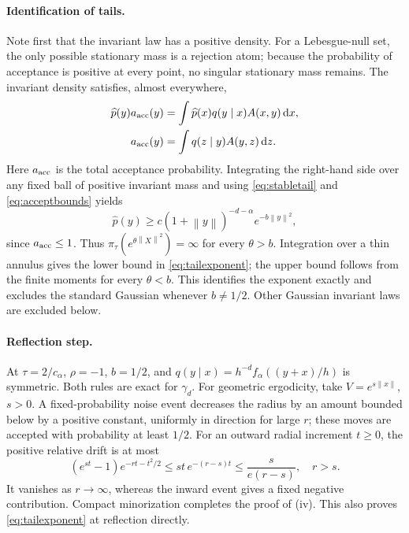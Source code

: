 \documentclass[pdflatex,iicol,sn-mathphys-ay]{sn-jnl}
\theoremstyle{definition}\newtheorem{definition}[theorem]{Definition}
\theoremstyle{remark}\newtheorem{remark}[theorem]{Remark}
\numberwithin{equation}{section}
\newcommand{\norm}[1]{\left\lVert#1\right\rVert}\newcommand{\TV}{\mathrm{TV}}
\newcommand{\dd}{\,\mathrm d}\newcommand{\cA}{c_\alpha}\newcommand{\sg}{\operatorname{sigmoid}}
\newcommand{\1}{\mathbf 1}
\begin{document}
\paragraph{Identification of tails.} Note first that the invariant law has a positive density. For a Lebesgue-null set, the only possible stationary mass is a rejection atom; because the probability of acceptance is positive at every point, no singular stationary mass remains. The invariant density satisfies, almost everywhere,
\begin{equation}
\begin{aligned}
\widehat p(y)a_{\rm acc}(y)&=\int\widehat p(x)q(y\mid x)A(x,y)\dd x,\\
a_{\rm acc}(y)&=\int q(z\mid y)A(y,z)\dd z.
\end{aligned}\label{eq:stationaryflux}
\end{equation}
Here $a_{\rm acc}$ is the total acceptance probability. Integrating the right-hand side over any fixed ball of positive invariant mass and using \eqref{eq:stabletail} and \eqref{eq:acceptbounds} yields
\begin{equation}
\widehat p(y)\ge c(1+\norm y)^{-d-\alpha}e^{-b\norm y^2},\label{eq:densitylower}
\end{equation}
since $a_{\rm acc}\le1$. Thus $\widehat\pi_\tau(e^{\theta\norm X^2})=\infty$ for every $\theta>b$. Integration over a thin annulus gives the lower bound in \eqref{eq:tailexponent}; the upper bound follows from the finite moments for every $\theta<b$. This identifies the exponent exactly and excludes the standard Gaussian whenever $b\ne1/2$. Other Gaussian invariant laws are excluded below.

\paragraph{Reflection step.} At $\tau=2/\cA$, $\rho=-1$, $b=1/2$, and $q(y\mid x)=h^{-d}f_\alpha((y+x)/h)$ is symmetric. Both rules are exact for $\gamma_d$. For geometric ergodicity, take $V=e^{s\norm x}$, $s>0$. A fixed-probability noise event decreases the radius by an amount bounded below by a positive constant, uniformly in direction for large $r$; these moves are accepted with probability at least $1/2$. For an outward radial increment $t\ge0$, the positive relative drift is at most
\[
(e^{st}-1)e^{-rt-t^2/2}\le st\,e^{-(r-s)t}\le\frac{s}{e(r-s)},\quad r>s.
\]
It vanishes as $r\to\infty$, whereas the inward event gives a fixed negative contribution. Compact minorization completes the proof of (iv). This also proves \eqref{eq:tailexponent} at reflection directly.
\end{document}
